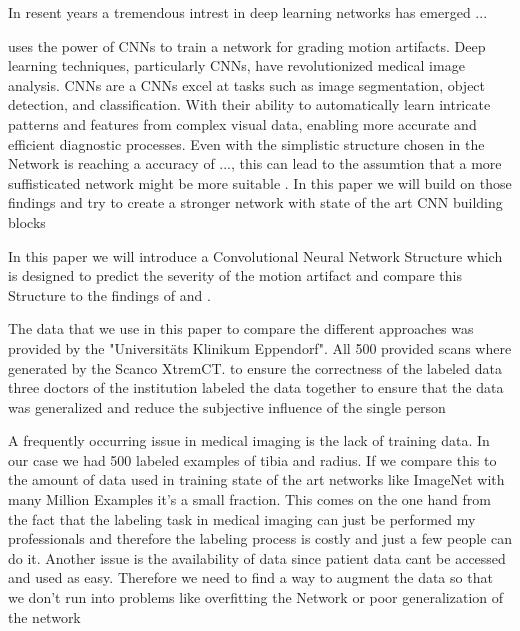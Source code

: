 \documentclass[
a4paper, 
12pt,
grayscalebody, %
abstract=on,
twoside, BCOR10mm, 12pt, DIV13,headinclude, footexclude, final, abstracton, openright
]{ibireprt}
\numberwithin{equation}{chapter}
\numberwithin{table}{chapter}
\numberwithin{figure}{chapter}
\numberwithin{algorithm}{chapter}
\numberwithin{example}{chapter}
\numberwithin{example}{chapter}
\begin{document}
In resent years a tremendous intrest in deep learning networks has emerged \cite{LeCun2015} ...\cite{Yamashita2018} %
 
  

\cite{Sode2011} uses the power of CNNs to train a network for grading motion artifacts. Deep learning techniques, particularly CNNs, have revolutionized medical image analysis. CNNs are a %
CNNs excel at tasks such as image segmentation, object detection, and classification. With their ability to automatically learn intricate patterns and features from complex visual data, enabling more accurate and efficient diagnostic processes. %
Even with the simplistic structure chosen in \cite{Sode2011} the Network is reaching a accuracy of ..., this can lead to the assumtion that a more suffisticated network might be more suitable . In this paper we will build on those findings and try to create a stronger network with state of the art CNN building blocks 


In this paper we will introduce a Convolutional Neural Network Structure which is designed to predict the severity of the motion artifact and compare this Structure to the findings of \cite{Sode2011} and \cite{Walle2023}. 

The data that we use in this paper to compare the different approaches was provided by the "Universitäts Klinikum Eppendorf". All 500 provided scans where generated by the Scanco XtremCT.%
to ensure the correctness of the labeled data three doctors of the institution labeled the data together to ensure that the data was generalized and reduce the subjective influence of the single person  


A frequently occurring issue in medical imaging is the lack of training data. In our case we had 500 labeled examples of tibia and radius. If we compare this to the amount of data used in training state of the art networks like ImageNet with many Million Examples it's a small fraction. This comes on the one hand from the fact that the labeling task in medical imaging can just be performed my professionals and therefore the labeling process is costly and just a few people can do it. Another issue is the availability of data since patient data cant be accessed and used as easy. Therefore we need to find a way to augment the data so that we don't run into problems like overfitting the Network or poor generalization of the network
\end{document}
